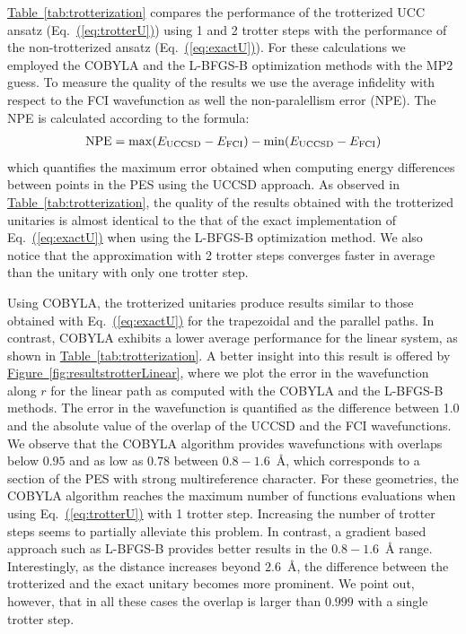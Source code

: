 \documentclass[superscriptaddress,aps,pra,twocolumn,nofootinbib,babel]{revtex4-1}
\newcommand{\eq}[1]{Eq.~\hyperref[eq:#1]{(\ref*{eq:#1})}}
\newcommand{\tab}[1]{\hyperref[tab:#1]{Table~\ref*{tab:#1}}}
\newcommand{\fig}[1]{\hyperref[fig:#1]{Figure~\ref*{fig:#1}}}
\begin{document}
\tab{trotterization} compares the performance of the trotterized UCC ansatz (\eq{trotterU}) using 1 and 2 trotter steps with the performance of the non-trotterized ansatz (\eq{exactU}). For these calculations we employed the COBYLA and the L-BFGS-B optimization methods with the MP2 guess. To measure the quality of the results we use the average infidelity with respect to the FCI wavefunction as well the non-paralellism error (NPE). The NPE is calculated according to the formula:
\begin{align}\label{NPE}
\mathrm{NPE} = \max(E_\mathrm{\rm UCCSD}-E_\mathrm{FCI})-\min(E_\mathrm{UCCSD}-E_\mathrm{FCI})
\end{align}
which quantifies the maximum error obtained when computing energy differences between points in the PES using the UCCSD approach. As observed in \tab{trotterization}, the quality of the results obtained with the trotterized unitaries is almost identical to the that of the exact implementation of \eq{exactU} when using the L-BFGS-B optimization method. We also notice that the approximation with 2 trotter steps converges faster in average than the unitary with only one trotter step. 

Using COBYLA, the trotterized unitaries produce results similar to those obtained with \eq{exactU} for the trapezoidal and the parallel paths. In contrast, COBYLA exhibits a lower average performance for the linear system, as shown in \tab{trotterization}. A better insight into this result is offered by \fig{resultstrotterLinear}, where we plot the error in the wavefunction along $r$ for the linear path as computed with the COBYLA and the L-BFGS-B methods. The error in the wavefunction is quantified as the difference between 1.0 and the absolute value of the overlap of the UCCSD and the FCI wavefunctions. We observe that the COBYLA algorithm provides wavefunctions with overlaps below $0.95$ and as low as $0.78$ between $0.8-1.6$~{\AA}, which corresponds to a section of the PES with strong multireference character. For these geometries, the COBYLA algorithm reaches the maximum number of functions evaluations when using \eq{trotterU} with 1 trotter step. Increasing the number of trotter steps seems to partially alleviate this problem. In contrast, a gradient based approach such as L-BFGS-B provides better results in the $0.8-1.6$~{\AA} range. Interestingly, as the distance increases beyond $2.6$~{\AA}, the difference between the trotterized and the exact unitary becomes more prominent. We point out, however, that in all these cases the overlap is larger than $0.999$ with a single trotter step.
\end{document}
